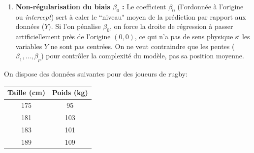 \documentclass[solutions]{../exercices}
\begin{document}
\begin{solution}
\begin{enumerate}
		\item \textbf{Non-régularisation du biais $\beta_0$ :}
		Le coefficient $\beta_0$ (l'ordonnée à l'origine ou \textit{intercept}) sert à caler le ``niveau" moyen de la prédiction par rapport aux données ($Y$). Si l'on pénalise $\beta_0$, on force la droite de régression à passer artificiellement près de l'origine $(0,0)$, ce qui n'a pas de sens physique si les variables $Y$ ne sont pas centrées. On ne veut contraindre que les pentes ($\beta_1, \dots, \beta_p$) pour contrôler la complexité du modèle, pas sa position moyenne.
	\end{enumerate}
\end{solution}

\begin{exercice}

On dispose des données suivantes pour des joueurs de rugby:
\begin{center}
	\begin{tabular}{|c|c|}
		\hline
		\textbf{Taille} (cm) & \textbf{Poids} (kg) \\ \hline
		175             & 95             \\
		181             & 103            \\
		183             & 101            \\
		189             & 109            \\
		\hline
	\end{tabular}
\end{center}


\end{exercice}
\end{document}
